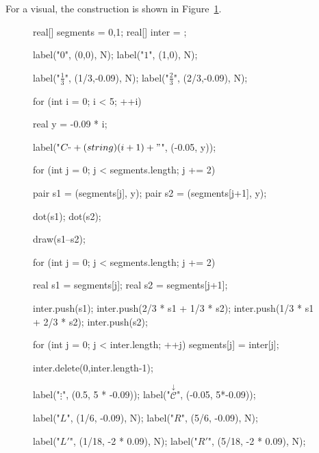 \documentclass[../key.tex]{subfiles}
\begin{document}
\noindent For a visual, the construction is shown in Figure~\ref{fig:construct_cantor}.
\begin{figure}[h]
	\begin{center}
		\begin{minipage}[b]{\textwidth}
			\centering
			\begin{asy}[width=0.7\textwidth]
			real[] segments = {0,1};
			real[] inter = {};
			
			label("$0$", (0,0), N);
			label("$1$", (1,0), N);
			
			label("$\frac{1}{3}$", (1/3,-0.09), N);
			label("$\frac{2}{3}$", (2/3,-0.09), N);
			
			for (int i = 0; i < 5; ++i) {
				real y = -0.09 * i;
			
				label("$C_" + (string) (i+1) + "$", (-0.05, y));
			
				for (int j = 0; j < segments.length; j += 2) {
					pair s1 = (segments[j], y);
					pair s2 = (segments[j+1], y);
			
					dot(s1);
					dot(s2);
			
					draw(s1--s2);
				}
			
				for (int j = 0; j < segments.length; j += 2) {
					real s1 = segments[j];
					real s2 = segments[j+1];
			
					inter.push(s1);
					inter.push(2/3 * s1 + 1/3 * s2);
					inter.push(1/3 * s1 + 2/3 * s2);
					inter.push(s2);
				}
			
				for (int j = 0; j < inter.length; ++j) {
					segments[j] = inter[j];
				}
			
				inter.delete(0,inter.length-1);
			}
			
			label("$\vdots$", (0.5, 5 * -0.09));
			label("$\stackrel{\downarrow}{\mathcal{C}}$", (-0.05, 5*-0.09));
			
			label("$L$", (1/6, -0.09), N);
			label("$R$", (5/6, -0.09), N);
			
			label("$L'$", (1/18, -2 * 0.09), N);
			label("$R'$", (5/18, -2 * 0.09), N);
			\end{asy}
		\end{minipage}
	\end{center}
	\vspace*{-2\baselineskip}
	\begin{center}
		\begin{minipage}[t]{\textwidth}
			\label{fig:construct_cantor}
		\end{minipage}
	\end{center}
	\vspace*{-2\baselineskip}
\end{figure}
\end{document}
